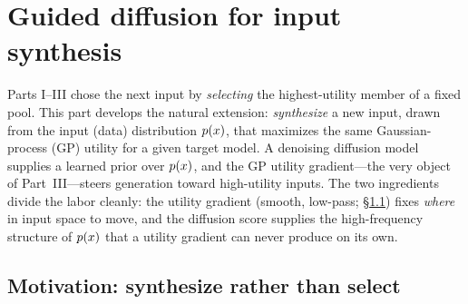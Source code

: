 
\section{Guided diffusion for input synthesis}\label{sec:diffusion}

Parts I--III chose the next input by \emph{selecting} the highest-utility member
of a fixed pool. This part develops the natural extension: \emph{synthesize} a new
input, drawn from the input (data) distribution $p(x)$, that maximizes the same
Gaussian-process (GP) utility for a given target model. A denoising diffusion model
supplies a learned prior over $p(x)$, and the GP utility gradient---the very object
of Part~III---steers generation toward high-utility inputs. The two ingredients
divide the labor cleanly: the utility gradient (smooth, low-pass;
\S\ref{sec:diff-motiv}) fixes \emph{where} in input space to move, and the
diffusion score supplies the high-frequency structure of $p(x)$ that a utility
gradient can never produce on its own.

\subsection{Motivation: synthesize rather than select}\label{sec:diff-motiv}

